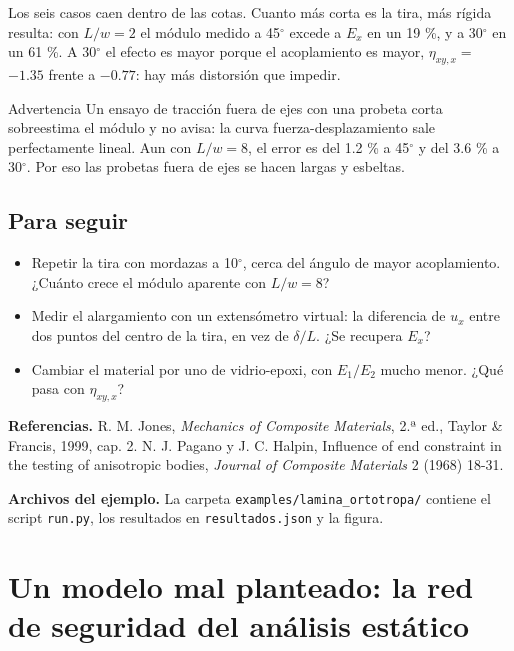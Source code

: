 \documentclass[11pt,oneside]{report}
\renewcommand{\chaptermark}[1]{\markboth{Cap.\ \thechapter\ ---\ #1}{}}
\begin{document}
Los seis casos caen dentro de las cotas. Cuanto más corta es la tira, más rígida resulta: con $L/w = 2$ el módulo medido a 45\ensuremath{^{\circ}} excede a $E_x$ en un 19 \%, y a 30\ensuremath{^{\circ}} en un 61 \%. A 30\ensuremath{^{\circ}} el efecto es mayor porque el acoplamiento es mayor, $\eta_{xy,x} =$ $-1.35$ frente a $-0.77$: hay más distorsión que impedir.

\begin{warnbox}{Advertencia}
Un ensayo de tracción fuera de ejes con una probeta corta sobreestima el módulo y no avisa: la curva fuerza-desplazamiento sale perfectamente lineal. Aun con $L/w = 8$, el error es del 1.2 \% a 45\ensuremath{^{\circ}} y del 3.6 \% a 30\ensuremath{^{\circ}}. Por eso las probetas fuera de ejes se hacen largas y esbeltas.
\end{warnbox}

\section{Para seguir}

\begin{itemize}
  \item Repetir la tira con mordazas a 10\ensuremath{^{\circ}}, cerca del ángulo de mayor acoplamiento. ¿Cuánto crece el módulo aparente con $L/w = 8$?
  \item Medir el alargamiento con un extensómetro virtual: la diferencia de $u_x$ entre dos puntos del centro de la tira, en vez de $\delta/L$. ¿Se recupera $E_x$?
  \item Cambiar el material por uno de vidrio-epoxi, con $E_1/E_2$ mucho menor. ¿Qué pasa con $\eta_{xy,x}$?
\end{itemize}

\textbf{Referencias.} R. M. Jones, \textit{Mechanics of Composite Materials}, 2.ª ed., Taylor \& Francis, 1999, cap. 2. N. J. Pagano y J. C. Halpin, \textquotedbl{}Influence of end constraint in the testing of anisotropic bodies\textquotedbl{}, \textit{Journal of Composite Materials} 2 (1968) 18-31.

\textbf{Archivos del ejemplo.} La carpeta \texttt{examples/\allowbreak{}lamina\_\allowbreak{}ortotropa/\allowbreak{}} contiene el script \texttt{run.py}, los resultados en \texttt{resultados.json} y la figura.


\newpage

\chapter{Un modelo mal planteado: la red de seguridad del análisis estático}
\chaptermark{Un modelo mal planteado}
\label{cap:modelo_mal_planteado}
\end{document}
